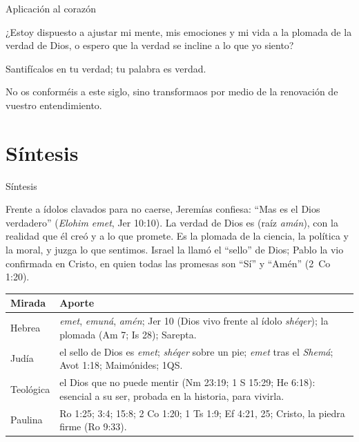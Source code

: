 \begin{frame}{Aplicación al corazón}
\begin{tcolorbox}[colback=papiro,colframe=dorado,boxrule=1.4pt,arc=3pt]
\centering\large ¿Estoy dispuesto a ajustar mi mente, mis emociones y mi vida a la plomada de la verdad de Dios, o espero que la verdad se incline a lo que yo siento?
\end{tcolorbox}\par\medskip
\begin{cita}Santifícalos en tu verdad; tu palabra es verdad.\end{cita}
\begin{cita}No os conforméis a este siglo, sino transformaos por medio de la renovación de vuestro entendimiento.\end{cita}
\end{frame}

\section{Síntesis}

\begin{frame}{Síntesis}
\begin{tcolorbox}[colback=papiro,colframe=azul,boxrule=1pt,arc=3pt]
\small Frente a ídolos clavados para no caerse, Jeremías confiesa: ``Mas \SENOR{} es el Dios verdadero'' (\emph{Elohim emet}, Jer 10:10). La verdad de Dios es  (raíz \emph{amán}),  con la realidad que él creó y  a lo que promete. Es la plomada de la ciencia, la política y la moral, y juzga lo que sentimos. Israel la llamó el ``sello'' de Dios; Pablo la vio confirmada en Cristo, en quien todas las promesas son ``Sí'' y ``Amén'' (2~Co 1:20).
\end{tcolorbox}
\scriptsize\renewcommand{\arraystretch}{1.15}
\begin{tabular}{@{}>{\RaggedRight\arraybackslash}p{2.4cm}>{\RaggedRight\arraybackslash}p{9.4cm}@{}}
\toprule
\textbf{Mirada} & \textbf{Aporte} \\ \midrule
Hebrea & \emph{emet}, \emph{emuná}, \emph{amén}; Jer 10 (Dios vivo frente al ídolo \emph{shéqer}); la plomada (Am 7; Is 28); Sarepta. \\
Judía & el sello de Dios es \emph{emet}; \emph{shéqer} sobre un pie; \emph{emet} tras el \emph{Shemá}; Avot 1:18; Maimónides; 1QS. \\
Teológica & el Dios que no puede mentir (Nm 23:19; 1 S 15:29; He 6:18): esencial a su ser, probada en la historia, para vivirla. \\
Paulina & Ro 1:25; 3:4; 15:8; 2 Co 1:20; 1 Ts 1:9; Ef 4:21, 25; Cristo, la piedra firme (Ro 9:33). \\
\bottomrule
\end{tabular}
\end{frame}

